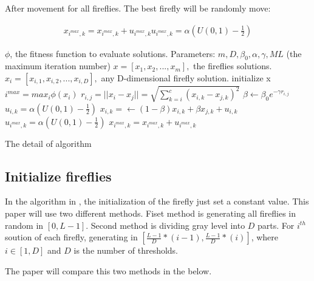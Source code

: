 \documentclass[conference]{IEEEtran}
\begin{document}
After movement for all fireflies. The best firefly will be randomly move:

\begin{equation}
\begin{aligned}
    \label{best firefly movement}
    x_{i^{max},k}=x_{i^{max},k}+u_{i^{max},k}
    u_{i^{max},k}=\alpha(U(0,1)-\frac{1}{2})
\end{aligned}
\end{equation}

\begin{algorithm}
\begin{algorithmic}[1]
    \STATE $\phi$, the fitness function to evaluate solutions.
    \STATE Parameters: $m, D,\beta_0,\alpha,\gamma,ML$ (the maximum iteration number) 
    \STATE $x=[x_1,x_2,...,x_m],$ the fireflies solutions.
    \STATE $x_i=[x_{i,1},x_{i,2},...,x_{i,D}],$ any D-dimensional firefly solution.
    \STATE initialize x
        \STATE $i^{max}=max_{i}\phi(x_i)$
                    \STATE $r_{i,j}=||x_i-x_j||=\sqrt{\sum\limits_{k=i}^{c}(x_{i,k}-x_{j,k})^2}$
                    \STATE $\beta\leftarrow\beta_0 e^{-\gamma r_{i,j}}$
                        \STATE $u_{i,k}=\alpha(U(0,1)-\frac{1}{2})$
                        \STATE $x_{i,k}=\leftarrow (1-\beta)x_{i,k}+\beta x_{j,k}+u_{i,k}$
                    \ENDFOR
                \ENDIF
            \ENDFOR
        \ENDFOR
            \STATE $u_{i^{max},k}=\alpha(U(0,1)-\frac{1}{2})$
            \STATE $x_{i^{max},k}=x_{i^{max},k}+u_{i^{max},k}$
        \ENDFOR
    \ENDFOR
\end{algorithmic}
\caption{The detail of algorithm}
\end{algorithm}

\subsection{Initialize fireflies}
In the algorithm in \cite{b1}, the initialization of the firefly just set a constant value. This paper will use two different methods. Fiset method is generating all fireflies in random in $[0,L-1]$. Second method is dividing gray level into $D$ parts. For $i^{th}$ soution of each firefly, generating in $[\frac{L-1}{D}*(i-1),\frac{L-1}{D}*(i)]$, where $i\in[1,D]$ and $D$ is the number of thresholds. 

The paper will compare this two methods in the below.
\end{document}
